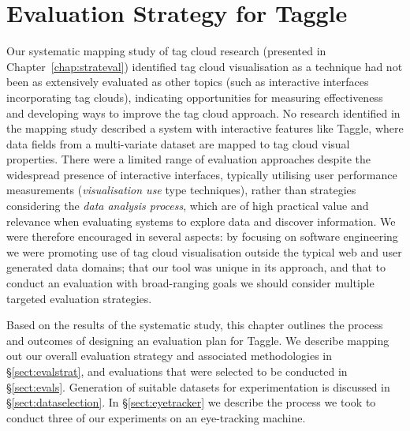 \chapter{Evaluation Strategy for Taggle}
\label{chap:eval}
\ifpdf
    \graphicspath{{Chapters/Evaluation/EvaluationFigs/PNG/}{Chapters/Evaluation/EvaluationFigs/PDF/}{Chapters/Evaluation/EvaluationFigs/}}
\else
    \graphicspath{{Chapters/Evaluation/EvaluationFigs/EPS/}{Chapters/Evaluation/EvaluationFigs/}}
\fi  


Our systematic mapping study of tag cloud research (presented in Chapter~\ref{chap:strateval}) identified tag cloud visualisation as a technique had not been as extensively evaluated as other topics (such as interactive interfaces incorporating tag clouds), indicating opportunities for measuring effectiveness and developing ways to improve the tag cloud approach. No research identified in the mapping study described a system with interactive features like Taggle, where data fields from a multi-variate dataset are mapped to tag cloud visual properties. There were a limited range of evaluation approaches despite the widespread presence of interactive interfaces, typically utilising user performance measurements (\emph{visualisation use} type techniques), rather than strategies considering the \emph{data analysis process}, which are of high practical value and relevance when evaluating systems to explore data and discover information. We were therefore encouraged in several aspects: by focusing on software engineering we were promoting use of tag cloud visualisation outside the typical web and user generated data domains; that our tool was unique in its approach, and that to conduct an evaluation with broad-ranging goals we should consider multiple targeted evaluation strategies. 

Based on the results of the systematic study, this chapter outlines the process and outcomes of designing an evaluation plan for Taggle. We describe mapping out our overall evaluation strategy and associated methodologies in \S\ref{sect:evalstrat}, and evaluations that were selected to be conducted in \S\ref{sect:evals}. Generation of suitable datasets for experimentation is discussed in \S\ref{sect:dataselection}. In \S\ref{sect:eyetracker} we describe the process we took to conduct three of our experiments on an eye-tracking machine. 


